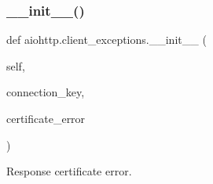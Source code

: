 \subsubsection{\texorpdfstring{\+\_\+\+\_\+init\+\_\+\+\_\+()}{\_\_init\_\_()}}
{\footnotesize\ttfamily def aiohttp.\+client\+\_\+exceptions.\+\_\+\+\_\+init\+\_\+\+\_\+ (\begin{DoxyParamCaption}\item[{}]{self,  }\item[{}]{connection\+\_\+key,  }\item[{}]{certificate\+\_\+error }\end{DoxyParamCaption})}

\begin{DoxyVerb}Response certificate error.\end{DoxyVerb}
 